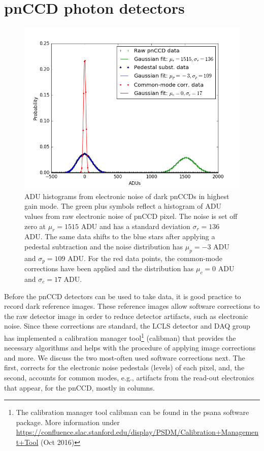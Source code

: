 \section{pnCCD photon detectors}\label{sec:pnccd-corr}
\begin{figure}
	\centering
		\includegraphics[height=0.45\textwidth]{images/pnCCD-electronic-noise.png}
	\caption[ADU histograms from electronic noise of dark pnCCDs.]{ADU histograms from electronic noise of dark pnCCDs in highest gain mode. The green plus symbols reflect a histogram of ADU values from raw electronic noise of pnCCD pixel. The noise is set off zero at $\mu_{r}=1515$ ADU and has a standard deviation $\sigma_{r}=136$ ADU. The same data shifts to the blue stars after applying a pedestal subtraction and the noise distribution has $\mu_{p}=-3$ ADU and $\sigma_{p}=109$ ADU. For the red data points, the common-mode corrections have been applied and the distribution has $\mu_{c}=0$ ADU and $\sigma_{c}=17$ ADU.}
	\label{fig:pnCCD-electronic-noise}
\end{figure}
Before the pnCCD detectors can be used to take data, it is good practice to record dark reference images. These reference images allow software corrections to the raw detector image in order to reduce detector artifacts, such as electronic noise. Since these corrections are standard, the LCLS detector and DAQ group has implemented a calibration manager tool\footnote{The calibration manager tool calibman can be found in the psana software package. More information under \url{https://confluence.slac.stanford.edu/display/PSDM/Calibration+Management+Tool} (Oct 2016)} (calibman) that provides the necessary algorithms and helps with the procedure of applying image corrections and more. We discuss the two most-often used software corrections next. The first, corrects for the electronic noise pedestals (levels) of each pixel, and, the second, accounts for common modes, e.g., artifacts from the read-out electronics that appear, for the pnCCD, mostly in columns.\\[1\baselineskip]
